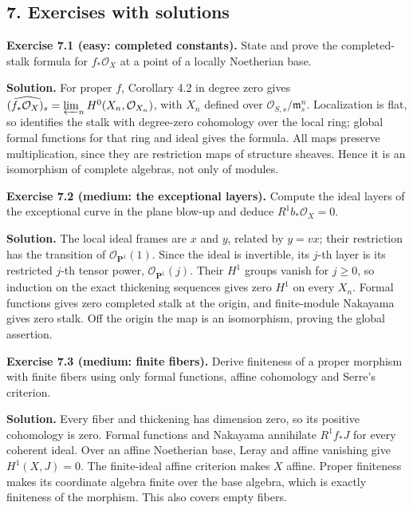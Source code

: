\documentclass[11pt]{article}
\begin{document}
\subsection{7. Exercises with
solutions}\label{exercises-with-solutions-9}

\textbf{Exercise 7.1 (easy: completed constants).} State and prove the
completed-stalk formula for \(f_*\mathcal O_X\) at a point of a locally
Noetherian base.

\textbf{Solution.} For proper \(f\), Corollary 4.2 in degree zero gives
\(\widehat{(f_*\mathcal O_X)_s}=\varprojlim_n H^0(X_n,\mathcal O_{X_n})\),
with \(X_n\) defined over \(\mathcal O_{S,s}/\mathfrak m_s^n\).
Localization is flat, so identifies the stalk with degree-zero
cohomology over the local ring; global formal functions for that ring
and ideal gives the formula. All maps preserve multiplication, since
they are restriction maps of structure sheaves. Hence it is an
isomorphism of complete algebras, not only of modules.

\textbf{Exercise 7.2 (medium: the exceptional layers).} Compute the
ideal layers of the exceptional curve in the plane blow-up and deduce
\(R^1b_*\mathcal O_X=0\).

\textbf{Solution.} The local ideal frames are \(x\) and \(y\), related
by \(y=vx\); their restriction has the transition of
\(\mathcal O_{\mathbf P^1}(1)\). Since the ideal is invertible, its
\(j\)-th layer is its restricted \(j\)-th tensor power,
\(\mathcal O_{\mathbf P^1}(j)\). Their \(H^1\) groups vanish for
\(j\geq0\), so induction on the exact thickening sequences gives zero
\(H^1\) on every \(X_n\). Formal functions gives zero completed stalk at
the origin, and finite-module Nakayama gives zero stalk. Off the origin
the map is an isomorphism, proving the global assertion.

\textbf{Exercise 7.3 (medium: finite fibers).} Derive finiteness of a
proper morphism with finite fibers using only formal functions, affine
cohomology and Serre's criterion.

\textbf{Solution.} Every fiber and thickening has dimension zero, so its
positive cohomology is zero. Formal functions and Nakayama annihilate
\(R^1f_*J\) for every coherent ideal. Over an affine Noetherian base,
Leray and affine vanishing give \(H^1(X,J)=0\). The finite-ideal affine
criterion makes \(X\) affine. Proper finiteness makes its coordinate
algebra finite over the base algebra, which is exactly finiteness of the
morphism. This also covers empty fibers.
\end{document}
